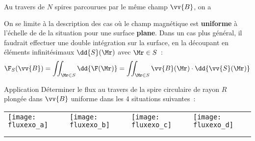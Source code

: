 \documentclass[../main/main.tex]{subfiles}
\begin{document}
\begin{rrema}{}
  Au travers de $N$ spires parcourues par le même champ $\vv{B}$, on a
\end{rrema}

On se limite à la description des cas où le champ magnétique est
\textbf{uniforme} à l'échelle de de la situation pour une surface
\textbf{plane}. Dans un cas plus général, il faudrait effectuer une double
intégration sur la surface, en la découpant en éléments infinitésimaux
$\dd{S}(\Mr)$ avec $\Mr \in S$~:
\[
  \F_S(\vv{B}) = \iint _{\Mr \in S}^{} \dd{\F(\Mr)} = \iint _{\Mr \in S}^{}
  \vv{B}(\Mr)\cdot \dd{\vv{S}(\Mr)}
\]

\begin{rexem}{Application}
  Déterminer le flux au travers de la spire circulaire de rayon $R$ plongée dans
  $\vv{B}$ uniforme dans les 4 situations suivantes~:
  \begin{center}
    \begin{tabularx}{\linewidth}{Y|Y|Y|Y}
      \texttt{[image: fluxexo\_a]} &
      \texttt{[image: fluxexo\_b]} &
      \texttt{[image: fluxexo\_c]} &
      \texttt{[image: fluxexo\_d]} \\
                                                    &
                                                    &
                                                    &
       \\
       &&&\\
    \end{tabularx}
  \end{center}
\end{rexem}
\end{document}
